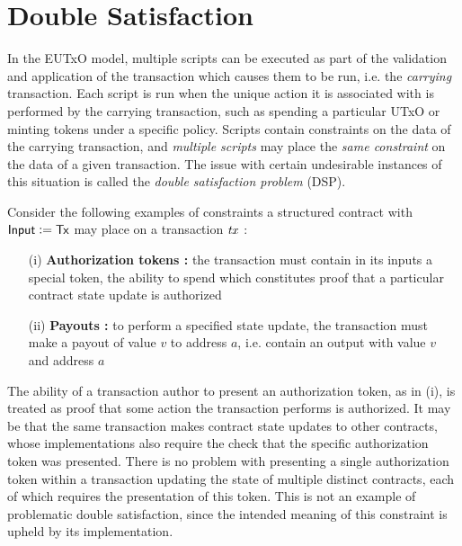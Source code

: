 \section{Double Satisfaction}
\label{sec:doublesat}

In the EUTxO model, multiple scripts can be executed as part of the validation and
application of the transaction which causes them to be run, i.e. the \emph{carrying}
transaction. Each script is run when the unique action it is associated with
is performed by the carrying transaction, such as spending a particular UTxO or
minting tokens under a specific
policy. Scripts contain constraints on the data of the carrying transaction,
and \emph{multiple scripts} may place the \emph{same constraint} on the data
of a given transaction. The issue with certain undesirable instances of this situation
is called the \emph{double satisfaction problem} (DSP).

Consider the following examples of constraints a structured contract with
$\textsf{Input} \mathrel{\mathop:}= \mathsf{Tx}$ may place on a transaction $\mathit{tx}$ :

\begin{itemize}
  \label{examples}

  \item[(i)] \textbf{Authorization tokens : } the transaction must contain in
  its inputs a special token, the ability to spend which constitutes proof that
  a particular contract state update is authorized

  \item[(ii)] \textbf{Payouts : } to perform a specified state update,
  the transaction must make a payout of value
  $v$ to address $a$, i.e. contain an output with value $v$ and address $a$
  \newline
\end{itemize}

The ability of a transaction author to present an authorization token, as in (i),
is treated as proof that some action the transaction performs is authorized.
It may be that the same transaction makes contract state updates to
other contracts, whose implementations also require the
check that the specific authorization token was presented. There is no problem
with presenting a single authorization token within a transaction updating the
state of multiple distinct contracts, each of which
requires the presentation of this token. This is not an
example of problematic double satisfaction,
since the intended meaning of this constraint is upheld by its implementation.

